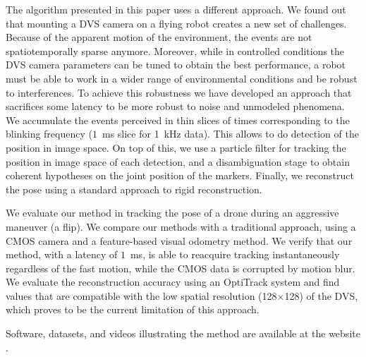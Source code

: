 The algorithm presented in this paper uses a different approach. We
found out that mounting a DVS camera on a flying robot creates a new
set of challenges. Because of the apparent motion of the environment,
the events are not spatiotemporally sparse anymore. Moreover, while
in controlled conditions the DVS camera parameters can be tuned to
obtain the best performance, a robot must be able to work in a wider
range of environmental conditions and be robust to interferences.
To achieve this robustness we have developed an approach that sacrifices
some latency to be more robust to noise and unmodeled phenomena. We
accumulate the events perceived in thin slices of times corresponding
to the blinking frequency ($1$~ms slice for 1~kHz data). This allows
to do detection of the \ALMs position in image space. On top of this,
we use a particle filter for tracking the position in image space
of each detection, and a disambiguation stage to obtain coherent hypotheses
on the joint position of the markers. Finally, we reconstruct the
pose using a standard approach to rigid reconstruction.

We evaluate our method in tracking the pose of a drone during an aggressive
maneuver (a flip). We compare our methods with a traditional approach,
using a CMOS camera and a feature-based visual odometry method. We
verify that our method, with a latency of $1$~ms, is able to reacquire
tracking instantaneously regardless of the fast motion, while the
CMOS data is corrupted by motion blur. We evaluate the reconstruction
accuracy using an OptiTrack system and find values that are compatible
with the low spatial resolution (128$\times$128) of the DVS, which
proves to be the current limitation of this approach.



Software, datasets, and videos illustrating the method are available
at the website \myurl.

\vfill\newpage
